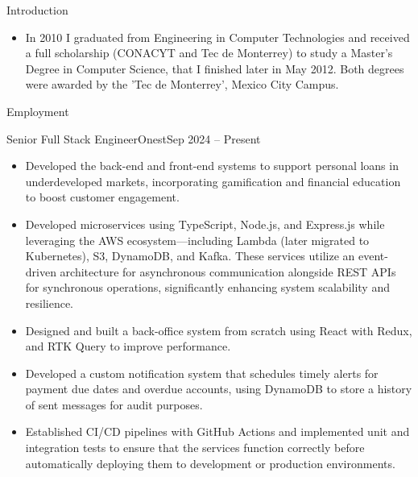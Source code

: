\documentclass[calibri]{../mcdowell-cv/mcdowellcv}
\begin{document}
	\makeheader
	
	\begin{cvsection}{Introduction}
		\begin{cvsubsection}{}{}{}
			\begin{itemize}
					\item In 2010 I graduated from Engineering in Computer Technologies and received a full scholarship (CONACYT and Tec de Monterrey) to study a Master’s Degree in Computer Science, that I finished later in May 2012. Both degrees were awarded by the ’Tec de Monterrey’, Mexico City Campus.
			\end{itemize}
		\end{cvsubsection}
	\end{cvsection}

	\begin{cvsection}{Employment}
		\begin{cvsubsection}{Senior Full Stack Engineer}{Onest}{Sep 2024 -- Present}
			\begin{itemize}
				\item Developed the back-end and front-end systems to support personal loans in underdeveloped markets, incorporating gamification and financial education to boost customer engagement.
				\item Developed microservices using TypeScript, Node.js, and Express.js while leveraging the AWS ecosystem—including Lambda (later migrated to Kubernetes), S3, DynamoDB, and Kafka. These services utilize an event-driven architecture for asynchronous communication alongside REST APIs for synchronous operations, significantly enhancing system scalability and resilience.
				\item Designed and built a back-office system from scratch using React with Redux, and RTK Query to improve performance.
				\item Developed a custom notification system that schedules timely alerts for payment due dates and overdue accounts, using DynamoDB to store a history of sent messages for audit purposes.
				\item Established CI/CD pipelines with GitHub Actions and implemented unit and integration tests to ensure that the services function correctly before automatically deploying them to development or production environments.
			\end{itemize}
		\end{cvsubsection}


\end{cvsection}
\end{document}
